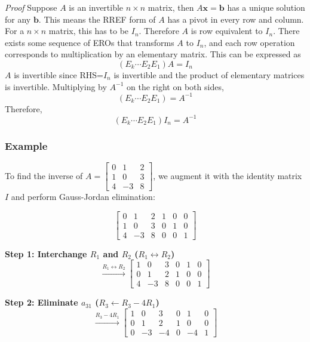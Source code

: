 \documentclass[../linear-algebra.tex]{subfiles}
\begin{document}
\noindent\textit{Proof} \newline
Suppose $A$ is an invertible $n\times n$ matrix, then $A\mathbf{x}=\mathbf{b}$ has a unique solution for any $\mathbf{b}$.
This means the RREF form of $A$ has a pivot in every row and column. For a $n\times n$ matrix, this has to be $I_n$.
Therefore $A$ is row equivalent to $I_n$. \newline
There exists some sequence of EROs that transforms $A$ to $I_n$, and each row operation
corresponds to multiplication by an elementary matrix. This can be expressed as
\[(E_k\cdots E_2E_1)A=I_n\]
$A$ is invertible since RHS=$I_n$ is invertible and the product of elementary matrices is invertible.\newline
Multiplying by $A^{-1}$ on the right on both sides,
\[(E_k\cdots E_2E_1)=A^{-1}\]
Therefore,
\[(E_k\cdots E_2E_1)I_n=A^{-1}\]

\subsubsection{Example}
To find the inverse of $A = \begin{bmatrix} 0 & 1 & 2 \\ 1 & 0 & 3 \\ 4 & -3 & 8 \end{bmatrix}$, we augment it with the identity matrix $I$ and perform Gauss-Jordan elimination:

\[
\left[ \begin{array}{ccc|ccc}
0 & 1 & 2 & 1 & 0 & 0 \\
1 & 0 & 3 & 0 & 1 & 0 \\
4 & -3 & 8 & 0 & 0 & 1
\end{array} \right]
\]

\textbf{Step 1: Interchange $R_1$ and $R_2$ ($R_1 \leftrightarrow R_2$)}
\[
\xrightarrow{R_1 \leftrightarrow R_2}
\left[ \begin{array}{ccc|ccc}
1 & 0 & 3 & 0 & 1 & 0 \\
0 & 1 & 2 & 1 & 0 & 0 \\
4 & -3 & 8 & 0 & 0 & 1
\end{array} \right]
\]

\textbf{Step 2: Eliminate $a_{31}$ ($R_3 \leftarrow R_3 - 4R_1$)}
\[
\xrightarrow{R_3 - 4R_1}
\left[ \begin{array}{ccc|ccc}
1 & 0 & 3 & 0 & 1 & 0 \\
0 & 1 & 2 & 1 & 0 & 0 \\
0 & -3 & -4 & 0 & -4 & 1
\end{array} \right]
\]
\end{document}
